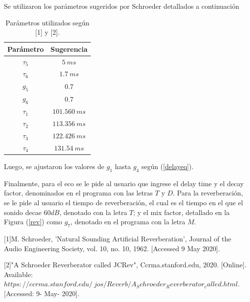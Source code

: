 Se utilizaron los parámetros sugeridos por Schroeder detallados a continuación

\begin{table}[H]
\centering
\begin{tabular}{@{}cc@{}}
\toprule
Parámetro & Sugerencia \\ \midrule
$\tau_5$ & $5 \ ms$ \\
$\tau_6$ & $1.7 \ ms$ \\
$g_5$ & $0.7$ \\
$g_6$ & $0.7$ \\
$\tau_1$ & $101.560 \ ms$ \\
$\tau_2$ & $113.356 \ ms$ \\
$\tau_3$ & $122.426 \ ms$ \\
$\tau_4$ & $131.54 \ ms$ \\ \bottomrule
\end{tabular}
\caption{Parámetros utilizados según [1] y [2].}
\end{table}

Luego, se ajustaron los valores de $g_1$ hasta $g_4$ según (\ref{delayeq}).

Finalmente, para el eco se le pide al usuario que ingrese el delay time y el decay factor, denominados en el programa con las letras $T$ y $D$. Para la reverberación, se le pide al usuario el tiempo de reverberación, el cual es el tiempo en el que el sonido decae $60dB$, denotado con la letra $T$; y el mix factor, detallado en la Figura (\ref{rev}) como $g_7$, denotado en el programa con la letra $M$.

[1]M. Schroeder, 'Natural Sounding Artificial Reverberation', Journal of the Audio Engineering Society, vol. 10, no. 10, 1962. [Accessed 9 May 2020].

[2]"A Schroeder Reverberator called JCRev", Ccrma.stanford.edu, 2020. [Online]. Available: \\ $https://ccrma.stanford.edu/~jos/Reverb/A_Schroeder_Reverberator_called.html$. [Accessed: 9- May- 2020].

